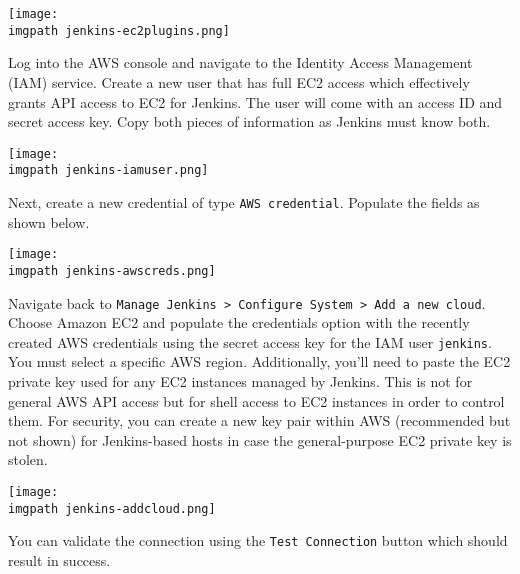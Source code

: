     \begin{minipage}[t]{\linewidth}
	  \centering
      \texttt{[image: \\imgpath jenkins-ec2plugins.png]}
    \end{minipage}

Log into the AWS console and navigate to the Identity Access Management (IAM)
service. Create a new user that has full EC2 access which effectively grants
API access to EC2 for Jenkins. The user will come with an access ID and secret
access key. Copy both pieces of information as Jenkins must know both.

    \begin{minipage}[t]{\linewidth}
	  \centering
      \texttt{[image: \\imgpath jenkins-iamuser.png]}
    \end{minipage}

Next, create a new credential of type \verb|AWS credential|. Populate the
fields as shown below.

    \begin{minipage}[t]{\linewidth}
	  \centering
      \texttt{[image: \\imgpath jenkins-awscreds.png]}
    \end{minipage}

Navigate back to \verb|Manage Jenkins > Configure System > Add a new cloud|.
Choose Amazon EC2 and populate the credentials option with the recently
created AWS credentials using the secret access key for the IAM user
\verb|jenkins|. You must select a specific AWS region. Additionally, you'll
need to paste the EC2 private key used for any EC2 instances managed by
Jenkins. This is not for general AWS API access but for shell access to EC2
instances in order to control them. For security, you can create a new key
pair within AWS (recommended but not shown) for Jenkins-based hosts in case
the general-purpose EC2 private key is stolen.

    \begin{minipage}[t]{\linewidth}
	  \centering
      \texttt{[image: \\imgpath jenkins-addcloud.png]}
    \end{minipage}

You can validate the connection using the \verb|Test Connection| button which
should result in success.

